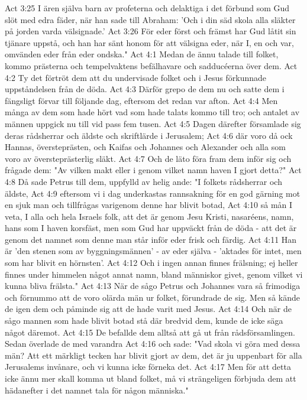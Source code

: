 Act 3:25  I ären själva barn av profeterna och delaktiga i det förbund som Gud slöt med edra fäder, när han sade till Abraham: 'Och i din säd skola alla släkter på jorden varda välsignade.'
Act 3:26  För eder först och främst har Gud låtit sin tjänare uppstå, och han har sänt honom för att välsigna eder, när I, en och var, omvänden eder från eder ondska."
Act 4:1  Medan de ännu talade till folket, kommo prästerna och tempelvaktens befälhavare och sadducéerna över dem.
Act 4:2  Ty det förtröt dem att du undervisade folket och i Jesus förkunnade uppståndelsen från de döda.
Act 4:3  Därför grepo de dem nu och satte dem i fängsligt förvar till följande dag, eftersom det redan var afton.
Act 4:4  Men många av dem som hade hört vad som hade talats kommo till tro; och antalet av männen uppgick nu till vid pass fem tusen.
Act 4:5  Dagen därefter församlade sig deras rådsherrar och äldste och skriftlärde i Jerusalem;
Act 4:6  där voro då ock Hannas, översteprästen, och Kaifas och Johannes och Alexander och alla som voro av översteprästerlig släkt.
Act 4:7  Och de läto föra fram dem inför sig och frågade dem: "Av vilken makt eller i genom vilket namn haven I gjort detta?"
Act 4:8  Då sade Petrus till dem, uppfylld av helig ande: "I folkets rådsherrar och äldste,
Act 4:9  eftersom vi i dag underkastas rannsakning för en god gärning mot en sjuk man och tillfrågas varigenom denne har blivit botad,
Act 4:10  så mån I veta, I alla och hela Israels folk, att det är genom Jesu Kristi, nasaréens, namn, hans som I haven korsfäst, men som Gud har uppväckt från de döda - att det är genom det namnet som denne man står inför eder frisk och färdig.
Act 4:11  Han är 'den stenen som av byggningsmännen' - av eder själva - 'aktades för intet, men som har blivit en hörnsten'.
Act 4:12  Och i ingen annan finnes frälsning; ej heller finnes under himmelen något annat namn, bland människor givet, genom vilket vi kunna bliva frälsta."
Act 4:13  När de sågo Petrus och Johannes vara så frimodiga och förnummo att de voro olärda män ur folket, förundrade de sig. Men så kände de igen dem och påminde sig att de hade varit med Jesus.
Act 4:14  Och när de sågo mannen som hade blivit botad stå där bredvid dem, kunde de icke säga något däremot.
Act 4:15  De befallde dem alltså att gå ut från rådsförsamlingen. Sedan överlade de med varandra
Act 4:16  och sade: "Vad skola vi göra med dessa män? Att ett märkligt tecken har blivit gjort av dem, det är ju uppenbart för alla Jerusalems invånare, och vi kunna icke förneka det.
Act 4:17  Men för att detta icke ännu mer skall komma ut bland folket, må vi strängeligen förbjuda dem att hädanefter i det namnet tala för någon människa."
